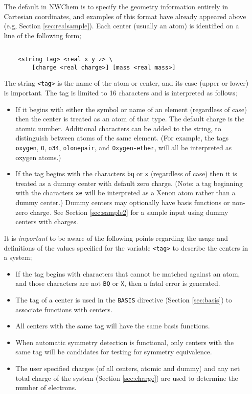 The default in NWChem is to specify the geometry information entirely
in Cartesian coordinates, and examples of this format have already
appeared above (e.g, Section \ref{sec:realsample}). Each center
(usually an atom) is identified on a line of the following form;
\begin{verbatim}

    <string tag> <real x y z> \
        [charge <real charge>] [mass <real mass>]

\end{verbatim}

The string \verb+<tag>+ is the name of the atom or center, and its case
(upper or lower) is important.  The tag is limited to 16 characters
and is interpreted as follows;
\begin{itemize}
\item If it begins with either the symbol or name of an element
  (regardless of case) then the center is treated as an atom of that type.
  The default charge is the atomic number. 
  Additional characters can
  be added to the string, to distinguish between atoms of the same element.
  (For example, the tags \verb+oxygen+, \verb+O+, \verb+o34+, \verb+olonepair+,
  and \verb+Oxygen-ether+, will all be interpreted as oxygen
  atoms.)
\item If the tag begins with the characters \verb+bq+ or \verb+x+
  (regardless of case) then it is treated as a dummy center with
  default zero charge.  (Note: a tag beginning with the characters \verb+xe+
  will be interpreted as a Xenon atom rather than a dummy center.)
  Dummy centers may optionally have basis
  functions or non-zero charge.
  See Section \ref{sec:sample2} for
  a sample input using dummy centers with charges.
\end{itemize}

It is {\em important} to be aware of the following points regarding the
usage and definitions of the values specified for the variable \verb+<tag>+
to describe the centers in a system;
\begin{itemize}
\item If the tag begins with characters that cannot be
    matched against an atom, and those characters are not \verb+BQ+ 
    or \verb+X+, then a fatal
    error is generated.
\item The tag of a center is used in the \verb+BASIS+ directive (Section
\ref{sec:basis}) to associate functions with centers.  
\item All centers with the same tag will have the same basis
functions.
\item When automatic symmetry detection is functional, only centers
with the same tag will be candidates for testing for symmetry
equivalence.
\item The user specified charges (of all centers, atomic and dummy)
and any net total charge of the system (Section \ref{sec:charge}) are
used to determine the number of electrons.
\end{itemize}

